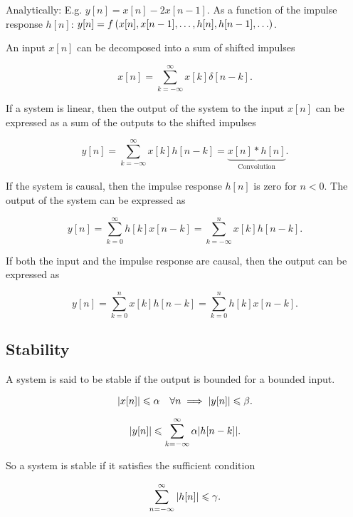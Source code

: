\documentclass{report}
\begin{document}
\begin{enumerate}
	\ii Analytically: E.g. $y[n] = x[n] - 2x[n-1]$.
	\ii As a function of the impulse response $h[n]$: $y[n] = f\left( x[n], x[n-1],\ldots,h[n], h[n-1], \ldots \right)$.
\end{enumerate}


An input $x[n]$ can be decomposed into a sum of shifted impulses

\[
	x[n] = \sum_{k=-\infty}^{\infty} x[k]\delta[n-k]
	.\]

If a system is linear, then the output of the system to the input $x[n]$ can be expressed as a sum of the outputs to the shifted impulses

\[
	y[n] = \sum_{k=-\infty}^{\infty} x[k]h[n-k] = \underbrace{x[n]*h[n]}_{\text{Convolution}}
	.\]


If the system is causal, then the impulse response $h[n]$ is zero for $n<0$. The output of the system can be expressed as

\[
	y[n] = \sum_{k=0}^{\infty} h[k]x[n-k] = \sum_{k=-\infty}^{n} x[k]h[n-k]
	.\]

If both the input and the impulse response are causal, then the output can be expressed as

\[
	y[n] = \sum_{k=0}^{n} x[k]h[n-k] = \sum_{k=0}^{n} h[k]x[n-k]
	.\]

\subsection{Stability}

A system is said to be stable if the output is bounded for a bounded input.

\[
	\abs{x[n]} \leqslant \alpha \quad \forall n \implies \abs{y[n]} \leqslant \beta
	.\]

\[
	\abs{y[n]} \leqslant \sum_{k=-\infty}^{\infty} \alpha\abs{h[n-k]}
	.\]

So a system is stable if it satisfies the sufficient condition

\[
	\sum_{n=-\infty}^{\infty} \abs{h[n]} \leqslant \gamma
	.\]

\end{document}
